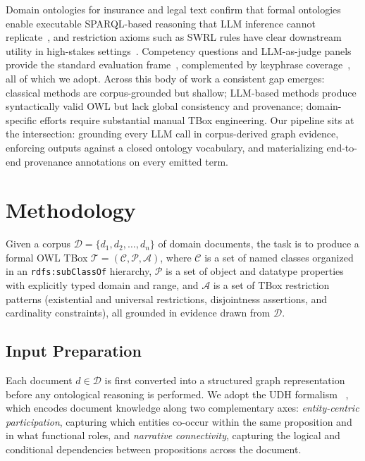 \documentclass[sigconf]{acmart}
\begin{document}
Domain ontologies for insurance and legal text confirm that formal ontologies enable 
executable SPARQL-based reasoning that LLM inference cannot replicate~\cite{ahaggach2023information,
charalambous2022analyzing,el2017towards,naqvi12023ontology}, and restriction axioms such as SWRL 
rules have clear downstream utility in high-stakes settings~\cite{amith2022expressing,horrocks2004swrl}. 
Competency questions and LLM-as-judge panels provide the standard evaluation frame~\cite{araujo2016data,
bezerra2013evaluating,liu2023g,zheng2023judging}, complemented by keyphrase coverage~\cite{mridul2026benchmark}, 
all of which we adopt.
Across this body of work a consistent gap emerges: classical methods are corpus-grounded but shallow; LLM-based methods produce syntactically valid OWL but lack global consistency and provenance; domain-specific efforts require substantial manual TBox engineering. Our pipeline sits at the intersection: grounding every LLM call in corpus-derived graph evidence, enforcing outputs against a closed ontology vocabulary, and materializing end-to-end provenance annotations on every emitted term.

\section{Methodology}
\label{sec:methodology}

Given a corpus $\mathcal{D} = \{d_1, d_2, \ldots, d_n\}$ of domain documents, the task is to produce a formal OWL TBox $\mathcal{T} = (\mathcal{C}, \mathcal{P}, \mathcal{A})$, where $\mathcal{C}$ is a set of named classes organized in an \texttt{rdfs:subClassOf} hierarchy, $\mathcal{P}$ is a set of object and datatype properties with explicitly typed domain and range, and $\mathcal{A}$ is a set of TBox restriction patterns (existential and universal restrictions, disjointness assertions, and cardinality constraints), all grounded in evidence drawn from $\mathcal{D}$.

\vspace{-2pt}
\subsection{Input Preparation}
Each document $d \in \mathcal{D}$ is first converted into a structured graph representation before any ontological reasoning is performed. We adopt the UDH formalism ~\cite{udh2026}, which encodes document knowledge along two complementary axes: \textit{entity-centric participation}, capturing which entities co-occur within the same proposition and in what functional roles, and \textit{narrative connectivity}, capturing the logical and conditional dependencies between propositions across the document.
\end{document}
